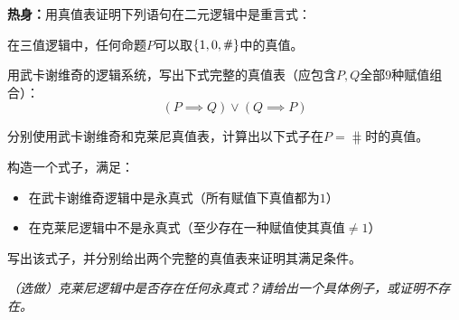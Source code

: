 \documentclass{quiz}
\begin{document}
\clearpage
\begin{questions}

  \question \textbf{热身：}用真值表证明下列语句在二元逻辑中是重言式：
  \begin{parts}
    \part $\neg(\phi \land \neg\phi)$
    \part $(\phi \implies \psi) \lor (\psi \implies \phi)$
    \part $\neg\phi \implies (\phi \implies \psi)$
  \end{parts}

\end{questions}




在三值逻辑中，任何命题$P$可以取$\set{1, 0, \hash}$中的真值。

\begin{questions}

  \question 用武卡谢维奇的逻辑系统，写出下式完整的真值表（应包含$P, Q$全部$9$种赋值组合）：
    \[ (P \implies Q) \lor (Q \implies P) \]
  
  \vspace{2.5in}
  
  \question 分别使用武卡谢维奇和克莱尼真值表，计算出以下式子在$P = \hash$时的真值。
  \clearpage
  
  \question 构造一个式子，满足：
  \begin{itemize}
    \item 在武卡谢维奇逻辑中是永真式（所有赋值下真值都为$1$）
    \item 在克莱尼逻辑中不是永真式（至少存在一种赋值使其真值$\neq 1$）
  \end{itemize}
  写出该式子，并分别给出两个完整的真值表来证明其满足条件。
  \vspace{3in}
  
  \question \em{（选做）}克莱尼逻辑中是否存在任何永真式？请给出一个具体例子，或证明不存在。
  
\end{questions}
\end{document}
